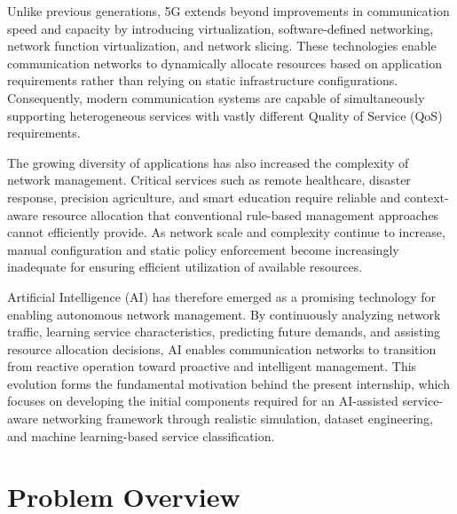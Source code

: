\documentclass[12pt,a4paper]{report}
\begin{document}
	Unlike previous generations, 5G extends beyond improvements in communication speed and capacity by introducing virtualization, software-defined networking, network function virtualization, and network slicing. These technologies enable communication networks to dynamically allocate resources based on application requirements rather than relying on static infrastructure configurations. Consequently, modern communication systems are capable of simultaneously supporting heterogeneous services with vastly different Quality of Service (QoS) requirements.
	
	The growing diversity of applications has also increased the complexity of network management. Critical services such as remote healthcare, disaster response, precision agriculture, and smart education require reliable and context-aware resource allocation that conventional rule-based management approaches cannot efficiently provide. As network scale and complexity continue to increase, manual configuration and static policy enforcement become increasingly inadequate for ensuring efficient utilization of available resources.
	
	Artificial Intelligence (AI) has therefore emerged as a promising technology for enabling autonomous network management. By continuously analyzing network traffic, learning service characteristics, predicting future demands, and assisting resource allocation decisions, AI enables communication networks to transition from reactive operation toward proactive and intelligent management. This evolution forms the fundamental motivation behind the present internship, which focuses on developing the initial components required for an AI-assisted service-aware networking framework through realistic simulation, dataset engineering, and machine learning-based service classification.
	
	
	\section{Problem Overview}
	\label{sec:problem_overview}
	
	
\end{document}
